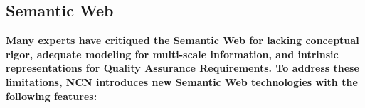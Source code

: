 
\begin{frame}{}
\section{Semantic Web}
\vspace{.5em}	


{\hspace*{-2pt}
\begin{minipage}[c]{\textwidth}\Large\centering
		\color{htxt} 	
\vspace{.1em}\textbf{%
Many experts have critiqued the Semantic Web for 
lacking conceptual rigor, adequate modeling for 
multi-scale information, and 
intrinsic representations for Quality 
Assurance Requirements.
To address these limitations, NCN 
introduces new Semantic Web technologies 
with the following features:}\end{minipage}}
\vspace{1.4em}
	

\end{frame}

